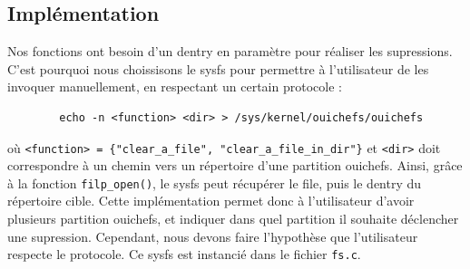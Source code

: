 \documentclass{article}
\begin{document}
	\subsection{Implémentation}
	Nos fonctions ont besoin d'un dentry en paramètre pour réaliser les supressions. C'est pourquoi nous choissisons le sysfs pour permettre à l'utilisateur de les invoquer manuellement, en respectant un certain protocole :
	\begin{lstlisting}
    	echo -n <function> <dir> > /sys/kernel/ouichefs/ouichefs
	\end{lstlisting}
    où \verb|<function> = {"clear_a_file", "clear_a_file_in_dir"}| et \verb|<dir>| doit correspondre à un chemin vers un répertoire d'une partition ouichefs. Ainsi, grâce à la fonction \verb|filp_open()|, le sysfs peut récupérer le file, puis le dentry du répertoire cible. Cette implémentation permet donc à l'utilisateur d'avoir plusieurs partition ouichefs, et indiquer dans quel partition il souhaite déclencher une supression. Cependant, nous devons faire l'hypothèse que l'utilisateur respecte le protocole.
    Ce sysfs est instancié dans le fichier \verb|fs.c|.
\end{document}
